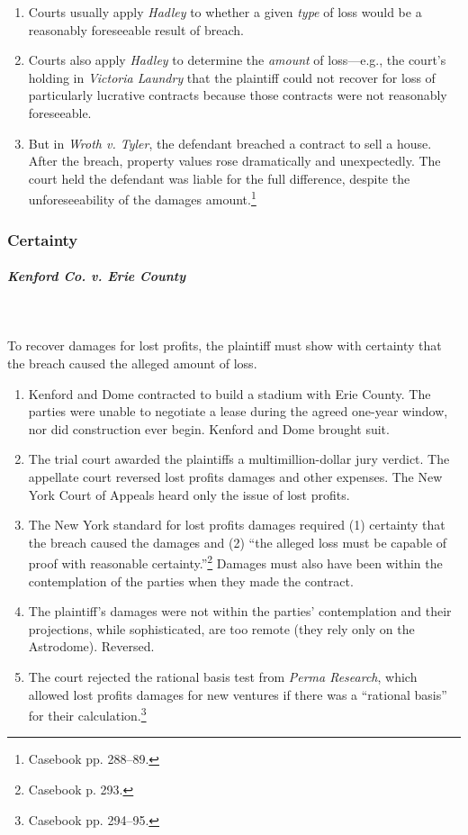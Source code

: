 \begin{enumerate}
    \item Courts usually apply \emph{Hadley} to whether a given \emph{type} of 
    loss would be a reasonably foreseeable result of breach.
    \item Courts also apply \emph{Hadley} to determine the \emph{amount} of 
    loss---e.g., the court's holding in \emph{Victoria Laundry} that the 
    plaintiff could not recover for loss of particularly lucrative contracts 
    because those contracts were not reasonably foreseeable.
    \item But in \emph{Wroth v. Tyler}, the defendant breached a contract to 
    sell a house. After the breach, property values rose dramatically and 
    unexpectedly. The court held the defendant was liable for the full 
    difference, despite the unforeseeability of the damages 
    amount.\footnote{Casebook pp. 288--89.}
\end{enumerate}

\subsubsection{Certainty}

\paragraph{\emph{Kenford Co. v. Erie County}}
~\\\\
To recover damages for lost profits, the plaintiff must show with certainty 
that the breach caused the alleged amount of loss.

\begin{enumerate}
    \item Kenford and Dome contracted to build a stadium with Erie County. 
    The parties were unable to negotiate a lease during the agreed one-year 
    window, nor did construction ever begin. Kenford and Dome brought suit.
    \item The trial court awarded the plaintiffs a multimillion-dollar jury 
    verdict. The appellate court reversed lost profits damages and other 
    expenses. The New York Court of Appeals heard only the issue of lost 
    profits.
    \item The New York standard for lost profits damages required (1) 
    certainty that the breach caused the damages and (2) ``the alleged loss 
    must be capable of proof with reasonable certainty.''\footnote{Casebook p. 
    293.} Damages must also have been within the contemplation of the parties 
    when they made the contract.
    \item The plaintiff's damages were not within the parties' contemplation 
    and their projections, while sophisticated, are too remote (they rely only 
    on the Astrodome). Reversed.
    \item The court rejected the rational basis test from \emph{Perma 
    Research}, which allowed lost profits damages for new ventures if there 
    was a ``rational basis'' for their calculation.\footnote{Casebook pp. 
    294--95.}
\end{enumerate}

